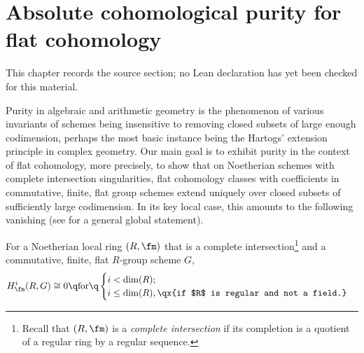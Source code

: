 \chapter{Absolute cohomological purity for flat cohomology}
\label{purity-flat-cohomology-chapter-01}

\begin{remark}
\label{purity-flat-cohomology-chapter-01-source}
This chapter records the source section; no Lean declaration has yet been checked for this material.
\notready
\end{remark}







Purity in algebraic and arithmetic geometry is the phenomenon of various invariants of schemes being insensitive to removing closed subsets of large enough codimension, perhaps the most basic instance being the Hartogs' extension principle in complex geometry. Our main goal is to exhibit purity in the context of flat cohomology, more precisely, to show that on Noetherian schemes with complete intersection singularities, flat cohomology classes with coefficients in commutative, finite, flat group schemes extend uniquely over closed subsets of sufficiently large codimension. In its key local case, this  amounts to the following vanishing (see  for a general global statement).

 \label{main}
For a Noetherian local ring $(R, \fm)$ that is a complete intersection\footnote{Recall that $(R, \fm)$ is a \emph{complete intersection} if its %
completion is a quotient of a regular %
ring by a regular sequence.} and a commutative, finite, flat $R$-group scheme $G$,
\[
H^i_\fm(R, G) \cong 0 \q \text{for} \q \begin{cases} i < \dim(R); \\ i \le \dim(R), \qx{if $R$ is regular and not a field.} \end{cases}
\]
\ethm




